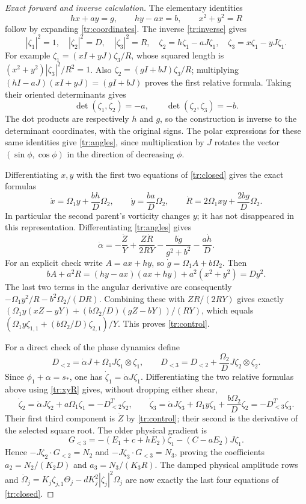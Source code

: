 \begin{proof}[Exact forward and inverse calculation]
The elementary identities
\[
 hx+ay=g,\qquad hy-ax=b,\qquad x^2+y^2=R
\]
follow by expanding \eqref{tr:coordinates}. The inverse
\eqref{tr:inverse} gives
\[
 |\zeta_1|^2=1,\quad |\zeta_2|^2=D,\quad
 |\zeta_3|^2=R,\quad
 \zeta_2=h\zeta_1-aJ\zeta_1,\quad
 \zeta_3=x\zeta_1-yJ\zeta_1.
\]
For example $\zeta_1=(xI+yJ)\zeta_3/R$, whose squared
length is $(x^2+y^2)|\zeta_3|^2/R^2=1$.
Also $\zeta_2=(gI+bJ)\zeta_3/R$; multiplying
$(hI-aJ)(xI+yJ)=(gI+bJ)$ proves the first relative formula.
Taking their oriented determinants gives
\[
 \det(\zeta_1,\zeta_2)=-a,\qquad
 \det(\zeta_2,\zeta_3)=-b.
\]
The dot products are respectively $h$ and $g$, so the construction
is inverse to the determinant coordinates, with the original signs.
The polar expressions for these same identities give
\eqref{tr:angles}, since multiplication by $J$ rotates the vector
$(\sin\phi,\cos\phi)$ in the direction of decreasing $\phi$.

Differentiating $x,y$ with the first two equations of
\eqref{tr:closed} gives the exact formulas
\begin{equation}\label{tr:xyR}
 \dot x=\Omega_1y+\frac{bh}{D}\Omega_2,
 \qquad \dot y=\frac{ba}{D}\Omega_2,
 \qquad \dot R=2\Omega_1xy+\frac{2bg}{D}\Omega_2.
\end{equation}
In particular the second parent's vorticity changes $y$; it has
not disappeared in this representation. Differentiating
\eqref{tr:angles} gives
\[
 \dot\alpha=-\frac{\dot Z}{Y}
       +\frac{Z\dot R}{2RY}
       -\frac{b\dot g}{g^2+b^2}-\frac{a\dot h}{D}.
\]
For an explicit check write $A=ax+hy$, so
$\dot g=\Omega_1A+b\Omega_2$. Then
\[
 bA+a^2R=(hy-ax)(ax+hy)+a^2(x^2+y^2)=Dy^2.
\]
The last two terms in the angular derivative are consequently
$-\Omega_1y^2/R-b^2\Omega_2/(DR)$.
Combining these with $Z\dot R/(2RY)$ gives exactly
$(\Omega_1y(xZ-yY)+(b\Omega_2/D)(gZ-bY))/(RY)$,
which equals
$(\Omega_1y\zeta_{1,1}+(b\Omega_2/D)\zeta_{2,1})/Y$.
This proves \eqref{tr:control}.

For a direct check of the phase dynamics define
\[
 D_{<2}=\dot\alpha J+
       \Omega_1J\zeta_1\otimes\zeta_1,\qquad
 D_{<3}=D_{<2}+\frac{\Omega_2}{D}
                         J\zeta_2\otimes\zeta_2.
\]
Since $\phi_1+\alpha=s_*$, one has
$\dot\zeta_1=\dot\alpha J\zeta_1$.
Differentiating the two relative formulas above using
\eqref{tr:xyR} gives, without dropping either shear,
\[
 \dot\zeta_2=\dot\alpha J\zeta_2+a\Omega_1\zeta_1
             =-D_{<2}^T\zeta_2,
 \qquad
 \dot\zeta_3=\dot\alpha J\zeta_3+\Omega_1y\zeta_1
                   +\frac{b\Omega_2}{D}\zeta_2
             =-D_{<3}^T\zeta_3.
\]
Their first third component is $\dot Z$ by
\eqref{tr:control}; their second is the derivative of the selected
square root. The older physical gradient is
\[
 G_{<3}=-(E_1+c+hE_2)\zeta_1-(C-aE_2)J\zeta_1.
\]
Hence $-J\zeta_2\cdot G_{<2}=N_2$ and
$-J\zeta_3\cdot G_{<3}=N_3$, proving the coefficients
$a_2=N_2/(K_2D)$ and $a_3=N_3/(K_3R)$.
The damped physical amplitude rows and
$\dot\Omega_j=K_j\zeta_{j,1}\Theta_j-dK_j^2|\zeta_j|^2\Omega_j$
are now exactly the last four equations of \eqref{tr:closed}.


\end{proof}
